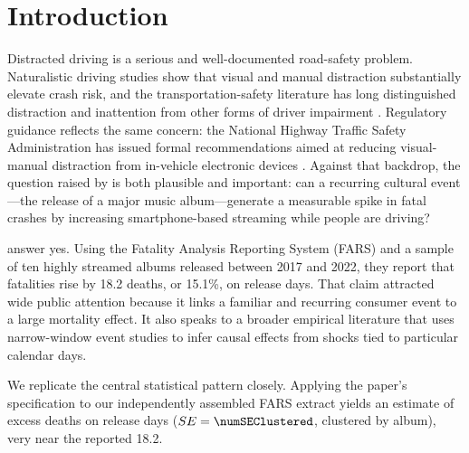 \documentclass[11pt]{article}
\begin{document}
\begin{abstract}
\begin{singlespace}
The mechanism remains untested. Crash comparisons by impaired-driver status cover all ten
albums using NHTSA's multiply imputed blood alcohol files. Because impairment can itself be
an outcome, this decomposition does not identify mediation. Ambient listening, measured as
the daily US chart total excluding new releases, has little estimated association with fatalities;
including it changes the release estimate by two hundredths of a death. These diagnostics
retain the association on the original dates while leaving its mechanism and broader
applicability unresolved.
\end{singlespace}
\end{abstract}


\section{Introduction}
\label{sec:intro}

Distracted driving is a serious and well-documented road-safety problem. Naturalistic driving studies show that visual and manual distraction substantially elevate crash risk, and the transportation-safety literature has long distinguished distraction and inattention from other forms of driver impairment \citep{klauer2006impact,regan2011driver,dingus2016crash}. Regulatory guidance reflects the same concern: the National Highway Traffic Safety Administration has issued formal recommendations aimed at reducing visual-manual distraction from in-vehicle electronic devices \citep{nhtsa2013visual}. Against that backdrop, the question raised by \citet{patel2026smartphones} is both plausible and important: can a recurring cultural event---the release of a major music album---generate a measurable spike in fatal crashes by increasing smartphone-based streaming while people are driving?

\citet{patel2026smartphones} answer yes. Using the Fatality Analysis Reporting System (FARS) and a sample of ten highly streamed albums released between 2017 and 2022, they report that fatalities rise by 18.2 deaths, or 15.1\%, on release days. That claim attracted wide public attention because it links a familiar and recurring consumer event to a large mortality effect. It also speaks to a broader empirical literature that uses narrow-window event studies to infer causal effects from shocks tied to particular calendar days.

We replicate the central statistical pattern closely. Applying the paper's specification to our
independently assembled FARS extract yields an estimate of \numEffectRegression{} excess deaths on
release days ($SE = \numSEClustered$, clustered by album), very near the reported 18.2.
\end{document}
